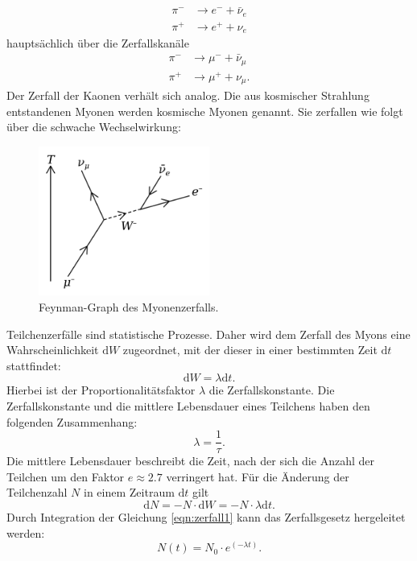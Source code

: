 \begin{align*}
  \pi^{-} & \rightarrow e^{-} + \bar{\nu}_{e} \\
  \pi^{+} & \rightarrow e^{+} + \nu_{e}
\end{align*}
\noindent
hauptsächlich über die Zerfallskanäle
\begin{align*}
\pi^{-} & \rightarrow \mu^{-} + \bar{\nu}_{\mu} \\
\pi^{+} & \rightarrow \mu^{+} + \nu_{\mu}.
\end{align*}
\noindent
Der Zerfall der Kaonen verhält sich analog. Die aus kosmischer Strahlung entstandenen
Myonen werden kosmische Myonen genannt.
Sie zerfallen wie folgt über die schwache Wechselwirkung:
\begin{figure}[H]
  \centering
  \includegraphics[width=0.5\textwidth]{pictures/Muon_Decay.png}
  \caption{Feynman-Graph des Myonenzerfalls.\cite{Myon-Wikipedia}}
  \label{zerfall}
\end{figure}
\noindent
Teilchenzerfälle sind statistische Prozesse. Daher wird dem Zerfall des Myons
eine Wahrscheinlichkeit $\text{d}W$  zugeordnet, mit der dieser in einer bestimmten Zeit $\text{d}t$
stattfindet:
\begin{equation*}
  \text{d}W = \lambda \text{d}t.
\end{equation*}
\noindent
Hierbei ist der Proportionalitätsfaktor $\lambda$ die Zerfallskonstante.
Die Zerfallskonstante und die mittlere Lebensdauer eines Teilchens haben den folgenden
Zusammenhang:
\begin{equation*}
  \lambda = \frac{1}{\tau}.
\end{equation*}
\noindent
Die mittlere Lebensdauer beschreibt die Zeit, nach der sich die Anzahl der Teilchen um
den Faktor $e \approx 2.7$ verringert hat.
Für die Änderung der Teilchenzahl $N$ in einem Zeitraum $\text{d}t$ gilt
\begin{equation}
  \text{d}N = - N \cdot \text{d}W = - N \cdot \lambda \text{d}t.
  \label{eqn:zerfall1}
\end{equation}
\noindent
Durch Integration der Gleichung \ref{eqn:zerfall1} kann das Zerfallsgesetz hergeleitet werden:
\begin{equation}
  N(t) = N_{0} \cdot e^{(-\lambda t)}.
  \label{eqn:zerfallsgesetz}
\end{equation}
\noindent
